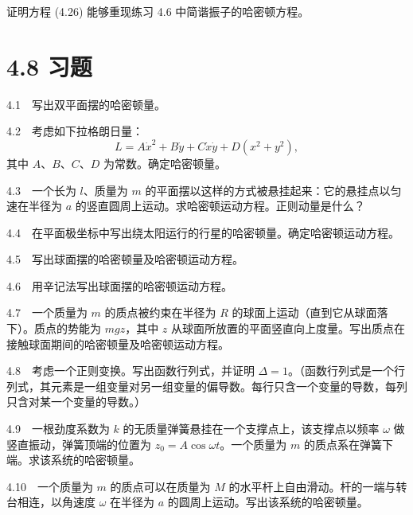 \begin{exercise}
证明方程 (4.26) 能够重现练习 4.6 中简谐振子的哈密顿方程。
\end{exercise}

\section*{4.8  习题}

4.1　写出双平面摆的哈密顿量。

4.2　考虑如下拉格朗日量：
$$
L = A\dot{x}^2 + B\dot{y} + C\dot{x}\dot{y} + D(x^2 + y^2) ,
$$
其中 $A$、$B$、$C$、$D$ 为常数。确定哈密顿量。

4.3　一个长为 $l$、质量为 $m$ 的平面摆以这样的方式被悬挂起来：它的悬挂点以匀速在半径为 $a$ 的竖直圆周上运动。求哈密顿运动方程。正则动量是什么？

4.4　在平面极坐标中写出绕太阳运行的行星的哈密顿量。确定哈密顿运动方程。

4.5　写出球面摆的哈密顿量及哈密顿运动方程。

4.6　用辛记法写出球面摆的哈密顿运动方程。

4.7　一个质量为 $m$ 的质点被约束在半径为 $R$ 的球面上运动（直到它从球面落下）。质点的势能为 $mgz$，其中 $z$ 从球面所放置的平面竖直向上度量。写出质点在接触球面期间的哈密顿量及哈密顿运动方程。

4.8　考虑一个正则变换。写出函数行列式，并证明 $\Delta = 1$。（函数行列式是一个行列式，其元素是一组变量对另一组变量的偏导数。每行只含一个变量的导数，每列只含对某一个变量的导数。）

4.9　一根劲度系数为 $k$ 的无质量弹簧悬挂在一个支撑点上，该支撑点以频率 $\omega$ 做竖直振动，弹簧顶端的位置为 $z_0 = A\cos\omega t$。一个质量为 $m$ 的质点系在弹簧下端。求该系统的哈密顿量。

4.10　一个质量为 $m$ 的质点可以在质量为 $M$ 的水平杆上自由滑动。杆的一端与转台相连，以角速度 $\omega$ 在半径为 $a$ 的圆周上运动。写出该系统的哈密顿量。

